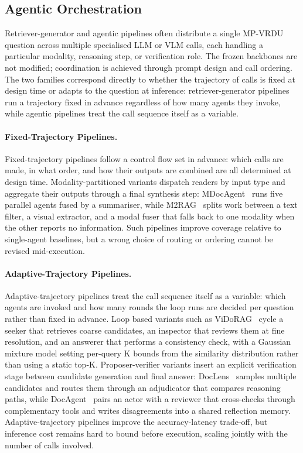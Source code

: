 \documentclass[11pt]{article}
\begin{document}
\subsection{Agentic Orchestration}
\label{sec:agenic-orchestration}
Retriever-generator and agentic pipelines often distribute a single MP-VRDU question across multiple specialised LLM or VLM calls, each handling a particular modality, reasoning step, or verification role. The frozen backbones are not modified; coordination is achieved through prompt design and call ordering. The two families correspond directly to whether the trajectory of calls is fixed at design time or adapts to the question at inference: retriever-generator pipelines run a trajectory fixed in advance regardless of how many agents they invoke, while agentic pipelines treat the call sequence itself as a variable.

\paragraph{Fixed-Trajectory Pipelines.}
Fixed-trajectory pipelines follow a control flow set in advance: which calls are made, in what order, and how their outputs are combined are all determined at design time. Modality-partitioned variants dispatch readers by input type and aggregate their outputs through a final synthesis step: MDocAgent~\cite{han2025mdocagent} runs five parallel agents fused by a summariser, while M2RAG~\cite{duan2025m2rag} splits work between a text filter, a visual extractor, and a modal fuser that falls back to one modality when the other reports no information. Such pipelines improve coverage relative to single-agent baselines, but a wrong choice of routing or ordering cannot be revised mid-execution.

\paragraph{Adaptive-Trajectory Pipelines.}
Adaptive-trajectory pipelines treat the call sequence itself as a variable: which agents are invoked and how many rounds the loop runs are decided per question rather than fixed in advance. Loop based variants such as ViDoRAG~\cite{wang2025vidorag} cycle a seeker that retrieves coarse candidates, an inspector that reviews them at fine resolution, and an answerer that performs a consistency check, with a Gaussian mixture model setting per-query K bounds from the similarity distribution rather than using a static top-K. Proposer-verifier variants insert an explicit verification stage between candidate generation and final answer: DocLens~\cite{zhu2025doclens} samples multiple candidates and routes them through an adjudicator that compares reasoning paths, while DocAgent~\cite{sun2025docagent} pairs an actor with a reviewer that cross-checks through complementary tools and writes disagreements into a shared reflection memory. Adaptive-trajectory pipelines improve the accuracy-latency trade-off, but inference cost remains hard to bound before execution, scaling jointly with the number of calls involved.
\end{document}
